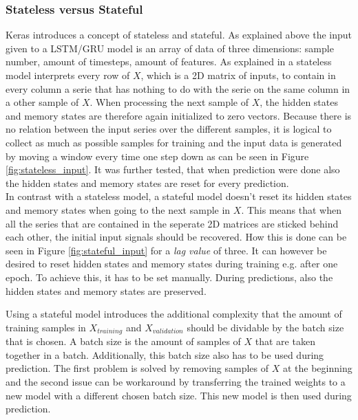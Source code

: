 \subsubsection{Stateless versus Stateful}
Keras introduces a concept of stateless and stateful. As explained above the input given to a LSTM/GRU model is an array of data of three dimensions: sample number, amount of timesteps, amount of features. As explained in \cite{FneishMo} a stateless model interprets every row of $ X $, which is a 2D matrix of inputs, to contain in every column a serie that has nothing to do with the serie on the same column in a other sample of $ X $. When processing the next sample of $ X $, the hidden states and memory states are therefore again initialized to zero vectors. Because there is no relation between the input series over the different samples, it is logical to collect as much as possible samples for training and the input data is generated by moving a window every time one step down as can be seen in Figure \ref{fig:stateless_input}. It was further tested, that when prediction were done also the hidden states and memory states are reset for every prediction.\\

In contrast with a stateless model, a stateful model doesn't reset its hidden states and memory states when going to the next sample in $ X $. This means that when all the series that are contained in the seperate 2D matrices are sticked behind each other, the initial input signals should be recovered. How this is done can be seen in Figure \ref{fig:stateful_input} for a \textit{lag value} of three. It can however be desired to reset hidden states and memory states during training e.g. after one epoch. To achieve this, it has to be set manually. During predictions, also the hidden states and memory states are preserved. 

Using a stateful model introduces the additional complexity that the amount of training samples in $ X_{training} $ and $ X_{validation} $ should be dividable by the batch size that is chosen. A batch size is the amount of samples of $ X $ that are taken together in a batch. Additionally, this batch size also has to be used during prediction. The first problem is solved by removing samples of $ X $ at the beginning and the second issue can be workaround by transferring the trained weights to a new model with a different chosen batch size. This new model is then used during prediction.\\

